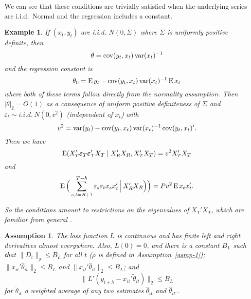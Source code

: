 \documentclass[11pt]{article}
\newcommand{\e}{\varepsilon}
\newtheorem{asmp}{Assumption}
\newtheorem{example}{Example}
\begin{document}
We can see that these conditions are trivially satisfied when the
underlying series are i.i.d.\ Normal and the regression includes a
constant.
\begin{example}
  If $(x_{t}, y_t)$ are i.i.d. $N(0, \Sigma)$ where $\Sigma$ is
  uniformly positive definite, then
  \begin{equation*}
    \theta = \operatorname{cov}(y_t, x_t) \operatorname{var}(x_t)^{-1}
  \end{equation*}
  and the regression constant is
  \begin{equation*}
    \theta_0 = \operatorname{E} y_t - \operatorname{cov}(y_t, x_t) \operatorname{var}(x_t)^{-1} \operatorname{E} x_t
  \end{equation*}
  where both of these terms follow directly from the normality
  assumption.  Then $|\theta|_2 = O(1)$ as a consequence of uniform
  positive definiteness of $\Sigma$ and $\varepsilon_t \sim i.i.d.\
  N(0, v^2)$ (independent of $x_t$) with
  \begin{equation*}
    v^2 = \operatorname{var}(y_t) - \operatorname{cov}(y_t, x_t) \operatorname{var}(x_t)^{-1} \operatorname{cov}(y_t, x_t)'.
  \end{equation*}
  Then we have
  \begin{equation*}
    \operatorname{E}(X_{T}'\boldsymbol{\varepsilon}_{T}\boldsymbol{\varepsilon}_{T}'X_T \mid X_{R}'X_{R}, X_{T}'X_{T})
    = v^2 X_{T}'X_{T}
  \end{equation*}
  and
  \begin{equation*}
    \E\Big( \sum_{s,t=R+1}^{T-h} \e_s \e_t x_s x_t'
    \,\Big|\, X_{R}'X_{R} \Big)\Big) = P v^2 \E x_t x_t'.
  \end{equation*}

  So the conditions amount to restrictions on the eigenvalues of
  $X_T'X_T$, which are familiar from general \ols.
\end{example}

\begin{asmp}\label{asmp-3}
  The loss function $L$ is continuous and has finite left and right
  derivatives almost everywhere.  Also, $L(0) = 0$, and there is a
  constant $B_L$ such that $\|D_t\|_\rho \leq B_L$ for all $t$ ($\rho$ is defined
  in Assumption~\ref{asmp-1}); $\| x_{it}' \hat{\theta}_{it} \|_2 \leq
  B_L$ and $\| x_{it}' \hat{\theta}_{it} \|_2 \leq B_L$; and
  \begin{equation*}
    \| L'(y_{t+h} - x_{it}'\tilde{\theta}_{it}) \|_2 \leq B_L
  \end{equation*}
  for $\tilde{\theta}_{it}$ a weighted average of any two estimates
  $\hat{\theta}_{it}$ and $\hat{\theta}_{it'}$.
\end{asmp}
\end{document}
